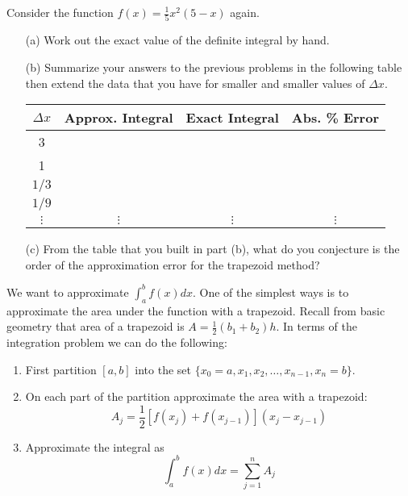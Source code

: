 \begin{problem}
    Consider the function $f(x) = \frac{1}{5}x^2(5-x)$ again.
    \begin{enumerate}
        \item[(a)] Work out the exact value of the definite integral by hand.
        \item[(b)] Summarize your answers to the previous problems in the following table
            then extend the data that you have for smaller and smaller values of $\Delta
            x$.
            \begin{center}
                \begin{tabular}{|c|c|c|c|}
                    \hline
                    $\Delta x$ & Approx. Integral & Exact Integral & Abs. \% Error \\
                    \hline \hline
                    3 & & & \\ \hline
                    1 & & & \\ \hline
                    $1/3$ & & & \\ \hline
                    $1/9$ & & & \\ \hline
                    $\vdots$ & $\vdots$& $\vdots$& $\vdots$\\ \hline
                \end{tabular}
            \end{center}
        \item[(c)] From the table that you built in part (b), what do you conjecture is
            the order of the approximation error for the trapezoid method?
    \end{enumerate}
\end{problem}


\begin{technique}
    We want to approximate $\displaystyle \int_a^b f(x) dx$.  One of the simplest ways is
    to approximate the area under the function with a trapezoid.  Recall from basic
    geometry that area of a
    trapezoid is $A = \frac{1}{2} (b_1 + b_2) h$.  In terms of the integration problem we
    can do the following:
    \begin{enumerate}
        \item First partition $[a,b]$ into the set $\{x_0=a, x_1, x_2, \ldots, x_{n-1},
        x_n=b\}$.
        \item On each part of the partition approximate the area with a trapezoid:
            \[ A_j = \frac{1}{2} \left[ f(x_j) + f(x_{j-1}) \right]\left(
            x_j - x_{j-1} \right) \]
        \item Approximate the integral as
            \[ \int_a^b f(x) dx = \sum_{j=1}^n A_j \]
    \end{enumerate}
\end{technique}

